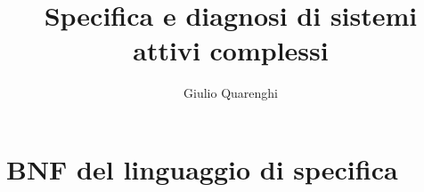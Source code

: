 \documentclass[11pt,a4paper,oneside]{book}
\author{Giulio Quarenghi}
\title{\large Specifica e diagnosi di sistemi attivi complessi}
\theoremstyle{plain}
\theoremstyle{definition}
\theoremstyle{definition}
\theoremstyle{remark}
\begin{document}

\frontmatter
	\tableofcontents



\mainmatter








\appendix
\chapter{BNF del linguaggio di specifica} \label{bnf}



\listoffigures

\nocite{*}


\end{document}
